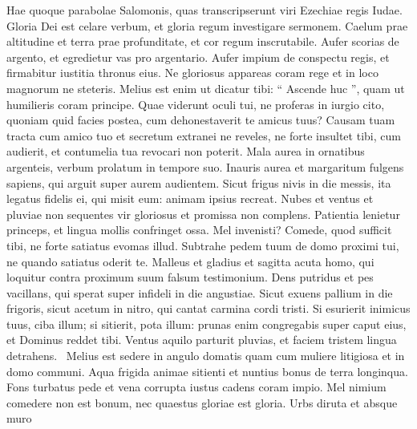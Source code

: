 \begin{biblechapter}
\begin{biblechapter}
\begin{biblechapter}
\begin{biblechapter}
\begin{biblechapter}
\begin{biblechapter}
\begin{biblechapter}
\begin{biblechapter}
\begin{biblechapter}
\begin{biblechapter}
\begin{biblechapter}
\begin{biblechapter}
\begin{biblechapter}
\begin{biblechapter}
\begin{biblechapter}
\begin{biblechapter}
\begin{biblechapter}
\begin{biblechapter}
\begin{biblechapter}
\begin{biblechapter}
\begin{biblechapter}
\begin{biblechapter}
\begin{biblechapter}
\begin{biblechapter}
\begin{biblechapter}
 \verse Hae quoque parabolae Salomonis, quas transcripserunt viri Ezechiae regis Iudae.
 \verse Gloria Dei est celare verbum,
 et gloria regum investigare sermonem.
 \verse Caelum prae altitudine et terra prae profunditate,
 et cor regum inscrutabile.
 \verse Aufer scorias de argento,
 et egredietur vas pro argentario.
 \verse Aufer impium de conspectu regis,
 et firmabitur iustitia thronus eius.
 \verse Ne gloriosus appareas coram rege
 et in loco magnorum ne steteris.
 \verse Melius est enim ut dicatur tibi: “ Ascende huc ”,
 quam ut humilieris coram principe.
 \verse Quae viderunt oculi tui,
 ne proferas in iurgio cito,
 quoniam quid facies postea,
 cum dehonestaverit te amicus tuus?
 \verse Causam tuam tracta cum amico tuo
 et secretum extranei ne reveles,
 \verse ne forte insultet tibi, cum audierit,
 et contumelia tua revocari non poterit.
 \verse Mala aurea in ornatibus argenteis,
 verbum prolatum in tempore suo.
 \verse Inauris aurea et margaritum fulgens
 sapiens, qui arguit super aurem audientem.
 \verse Sicut frigus nivis in die messis,
 ita legatus fidelis ei, qui misit eum:
 animam ipsius recreat.
 \verse Nubes et ventus et pluviae non sequentes
 vir gloriosus et promissa non complens.
 \verse Patientia lenietur princeps,
 et lingua mollis confringet ossa.
 \verse Mel invenisti? Comede, quod sufficit tibi,
 ne forte satiatus evomas illud.
 \verse Subtrahe pedem tuum de domo proximi tui,
 ne quando satiatus oderit te.
 \verse Malleus et gladius et sagitta acuta
 homo, qui loquitur contra proximum suum falsum testimonium.
 \verse Dens putridus et pes vacillans,
 qui sperat super infideli in die angustiae.
 \verse Sicut exuens pallium in die frigoris,
 sicut acetum in nitro,
 qui cantat carmina cordi tristi.
 \verse Si esurierit inimicus tuus, ciba illum;
 si sitierit, pota illum:
 \verse prunas enim congregabis super caput eius,
 et Dominus reddet tibi.
 \verse Ventus aquilo parturit pluvias,
 et faciem tristem lingua detrahens. 
 \verse Melius est sedere in angulo domatis
 quam cum muliere litigiosa et in domo communi.
 \verse Aqua frigida animae sitienti
 et nuntius bonus de terra longinqua.
 \verse Fons turbatus pede et vena corrupta
 iustus cadens coram impio.
 \verse Mel nimium comedere non est bonum,
 nec quaestus gloriae est gloria.
 \verse Urbs diruta et absque muro

\end{biblechapter}
\end{biblechapter}
\end{biblechapter}
\end{biblechapter}
\end{biblechapter}
\end{biblechapter}
\end{biblechapter}
\end{biblechapter}
\end{biblechapter}
\end{biblechapter}
\end{biblechapter}
\end{biblechapter}
\end{biblechapter}
\end{biblechapter}
\end{biblechapter}
\end{biblechapter}
\end{biblechapter}
\end{biblechapter}
\end{biblechapter}
\end{biblechapter}
\end{biblechapter}
\end{biblechapter}
\end{biblechapter}
\end{biblechapter}
\end{biblechapter}

